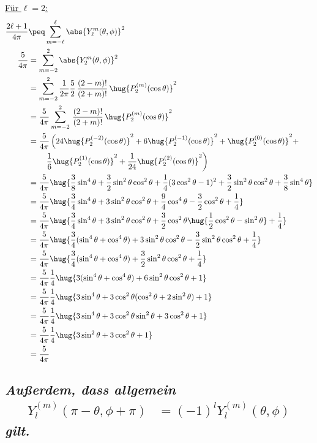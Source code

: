 \documentclass[ex,minted]{exercise_4.0}
\begin{document}
\underline{Für $\ell=2$:}
\begin{align*}
    \frac{2\ell+1}{4\pi} &\peq \sum_{m=-\ell}^\ell \abs{Y_\ell^m(\theta, \phi)}^2\\
    \frac{5}{4\pi} &= \sum_{m=-2}^2 \abs{Y_2^m(\theta, \phi)}^2\\
    &= \sum_{m=-2}^2 \frac{1}{2\pi}\frac{5}{2} \, \frac{(2- m)!}{(2+ m)!} \,\hug{ P_2^{(m)}(\cos \theta)}^2\\
    &= \frac{5}{4\pi}\sum_{m=-2}^2  \, \frac{(2- m)!}{(2+ m)!} \,\hug{ P_2^{(m)}(\cos \theta)}^2\\
    &= \frac{5}{4\pi}\left(24\hug{ P_2^{(-2)}(\cos \theta)}^2 + 6\hug{ P_2^{(-1)}(\cos \theta)}^2 + \hug{P_2^{(0)}(\cos \theta)}^2 +\right.\\
    &\qquad \left. \frac{1}{6}\hug{ P_2^{(1)}(\cos \theta)}^2 + \frac{1}{24}\hug{ P_2^{(2)}(\cos \theta)}^2 \right)\\
    &= \frac{5}{4\pi}\hug{\frac 38\sin^4\theta + \frac 32 \sin^2\theta\cos^2\theta + \frac14(3\cos^2\theta-1)^2 + \frac{3}{2}\sin^2\theta\cos^2\theta + \frac{3}{8}\sin^4\theta}\\
    &= \frac{5}{4\pi}\hug{\frac 34\sin^4\theta + 3 \sin^2\theta\cos^2\theta + \frac94\cos^4\theta- \frac 32\cos^2\theta + \frac14}\\
    &= \frac{5}{4\pi}\hug{\frac 34\sin^4\theta + 3 \sin^2\theta\cos^2\theta + \frac32\cos^2\theta\hug{\frac12\cos^2\theta-\sin^2\theta} + \frac14}\\
    &= \frac{5}{4\pi}\hug{\frac 34(\sin^4\theta + \cos^4\theta) + 3 \sin^2\theta\cos^2\theta - \frac32\sin^2\theta\cos^2\theta + \frac14}\\
    &= \frac{5}{4\pi}\hug{\frac 34(\sin^4\theta + \cos^4\theta) + \frac32\sin^2\theta\cos^2\theta + \frac14}\\
    &= \frac{5}{4\pi}\frac14\hug{3(\sin^4\theta + \cos^4\theta) + 6\sin^2\theta\cos^2\theta + 1}\\
    &= \frac{5}{4\pi}\frac14\hug{3\sin^4\theta +  3\cos^2\theta(\cos^2\theta + 2\sin^2\theta) + 1}\\
    &= \frac{5}{4\pi}\frac14\hug{3\sin^4\theta +  3\cos^2\theta\sin^2\theta + 3\cos^2\theta + 1}\\
    &= \frac{5}{4\pi}\frac14\hug{3\sin^2\theta + 3\cos^2\theta + 1}\\
    &= \frac{5}{4\pi}\\
\end{align*}

\subsection{\it Außerdem, dass allgemein 
\begin{align*}
    Y_l^{(m)} (\pi-\theta,\phi+\pi) &= (-1)^l Y_l^{(m)}(\theta,\phi)
\end{align*}
gilt.
}
\end{document}
